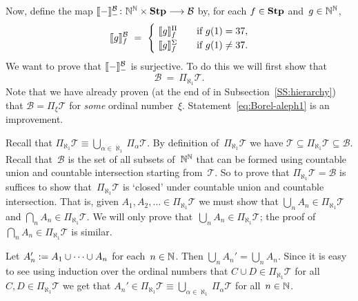 \documentclass[main.tex]{subfiles}
\begin{document}
Now, define 
the map
$\decode{-}^{\mathcal{B}}_{-}\colon 
  \N^\N\times \Stump \longrightarrow \mathcal{B}$
by, for each $f\in\mathbf{Stp}$ and~$g\in\mathbb{N}^{\mathbb{N}}$,
\begin{equation}
\label{eq:decode-Borel}
\decode{g}^{\mathcal{B}}_f \ = \ 
\begin{cases}
\  \decode{g}^{\Pi}_f  \quad
& \text{if $g(1)= 37$},\\

\ \decode{g}^{\Sigma}_f
& \text{if $g(1)\neq 37$}.
\end{cases}
\end{equation}
We want to prove that $\decode{-}^{\mathcal{B}}_{-}$
is surjective.
To do this
we will first show 
that
\begin{equation}
\label{eq:Borel-aleph1}
\mathcal{B} \ =\  \Pi_{\aleph_1} \mathcal{T}.
\end{equation}
Note that we have already proven 
(at the end of
in Subsection~\ref{SS:hierarchy})
 that $\mathcal{B} = \Pi_\xi \mathcal{T}$
for \emph{some} ordinal number~$\xi$.
Statement~\eqref{eq:Borel-aleph1}
is an improvement.

Recall that $\Pi_{\aleph_1}\mathcal{T}
\equiv \bigcup_{\alpha\in\aleph_1} \Pi_\alpha \mathcal{T}$.
By definition of~$\Pi_{\aleph_1}\mathcal{T}$
we have 
$\mathcal{T} \subseteq \Pi_{\aleph_1}\mathcal{T}\subseteq \mathcal{B}$.
Recall that~$\mathcal{B}$
is the set of all subsets of~$\mathbb{N}^{\mathbb{N}}$
that can be formed using countable union and countable intersection
starting from~$\mathcal{T}$.
So to prove that $\Pi_{\aleph_1}\mathcal{T} = \mathcal{B}$
is suffices
to show that~$\Pi_{\aleph_1}\mathcal{T}$
is `closed' under countable union and countable intersection.
That is,
given $A_1,A_2,\dotsc \in \Pi_{\aleph_1}\mathcal{T}$
we must show that  $\bigcup_n A_n \in \Pi_{\aleph_1}\mathcal{T}$
and  $\bigcap_n A_n \in \Pi_{\aleph_1}\mathcal{T}$.
We will only prove that~$\bigcup_n A_n \in \Pi_{\aleph_1}\mathcal{T}$;
the proof of~$\bigcap_n A_n \in \Pi_{\aleph_1}\mathcal{T}$
is similar.

Let $A_n' := A_1 \cup \dotsb \cup A_n$
for each~$n\in\mathbb{N}$.
Then $\bigcup_n A_n' = \bigcup_n A_n$.
Since it is easy to see
using induction over the ordinal numbers
that $C\cup D \in \Pi_{\aleph_1} \mathcal{T}$
for all~$C,D\in\Pi_{\aleph_1}\mathcal{T}$
we get that 
$A_n'\in \Pi_{\aleph_1}\mathcal{T}
\equiv\bigcup_{\alpha\in\aleph_1}\Pi_{\alpha}\mathcal{T}$
for all~$n\in\mathbb{N}$.
\end{document}
